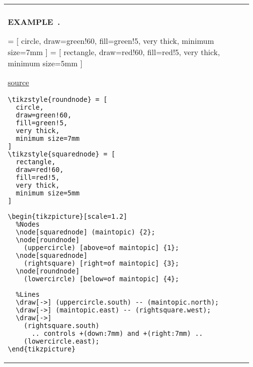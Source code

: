 \documentclass{article}
\newcounter{example}[section]
\newenvironment{example}[1][]{\refstepcounter{example}\par\medskip
  \begin{tabular}{|p{\textwidth}|}\hline\\{\bf EXAMPLE~\theexample. #1}}{\\\hline \end{tabular}}
\begin{document}
\begin{example}

  \begin{multicols}{2}
  \begin{center}
    
    \tikzstyle{roundnode} = [
      circle, 
      draw=green!60, 
      fill=green!5, 
      very thick, 
      minimum size=7mm
    ]
    \tikzstyle{squarednode} = [
      rectangle, 
      draw=red!60, 
      fill=red!5, 
      very thick, 
      minimum size=5mm
    ]

    \begin{tikzpicture}[scale=1.2]
      \node[squarednode] (maintopic)                        {2};
      \node[roundnode]   (uppercircle) [above=of maintopic] {1};
      \node[squarednode] (rightsquare) [right=of maintopic] {3};
      \node[roundnode]   (lowercircle) [below=of maintopic] {4};
 
      \draw[->] (uppercircle.south) -- (maintopic.north);
      \draw[->] (maintopic.east) -- (rightsquare.west);
      \draw[->] (rightsquare.south) 
                .. controls +(down:7mm) and +(right:7mm) .. 
                (lowercircle.east);
    \end{tikzpicture}

    \columnbreak

    \underline{source}
    {\small 
    \begin{verbatim}
\tikzstyle{roundnode} = [
  circle, 
  draw=green!60, 
  fill=green!5, 
  very thick, 
  minimum size=7mm
]
\tikzstyle{squarednode} = [
  rectangle, 
  draw=red!60, 
  fill=red!5, 
  very thick, 
  minimum size=5mm
]

\begin{tikzpicture}[scale=1.2]
  %Nodes
  \node[squarednode] (maintopic) {2};
  \node[roundnode] 
    (uppercircle) [above=of maintopic] {1};
  \node[squarednode] 
    (rightsquare) [right=of maintopic] {3};
  \node[roundnode]   
    (lowercircle) [below=of maintopic] {4};
 
  %Lines
  \draw[->] (uppercircle.south) -- (maintopic.north);
  \draw[->] (maintopic.east) -- (rightsquare.west);
  \draw[->] 
    (rightsquare.south) 
      .. controls +(down:7mm) and +(right:7mm) .. 
    (lowercircle.east);
\end{tikzpicture}
    \end{verbatim}
    }
  \end{center}

  \end{multicols}
\end{example}
\end{document}
